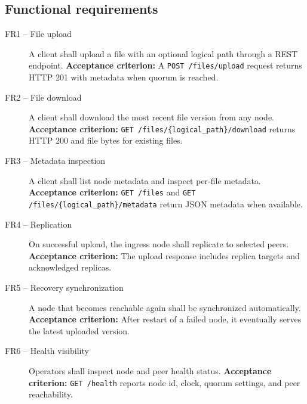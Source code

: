 \documentclass{scrartcl}
\begin{document}
\subsection*{Functional requirements}
\begin{description}
  \item[FR1 -- File upload] A client shall upload a file with an optional logical path through a REST endpoint.
  \textbf{Acceptance criterion:} A \texttt{POST /files/upload} request returns HTTP 201 with metadata when quorum is reached.

  \item[FR2 -- File download] A client shall download the most recent file version from any node.
  \textbf{Acceptance criterion:} \texttt{GET /files/\{logical\_path\}/download} returns HTTP 200 and file bytes for existing files.

  \item[FR3 -- Metadata inspection] A client shall list node metadata and inspect per-file metadata.
  \textbf{Acceptance criterion:} \texttt{GET /files} and \texttt{GET /files/\{logical\_path\}/metadata} return JSON metadata when available.

  \item[FR4 -- Replication] On successful upload, the ingress node shall replicate to selected peers.
  \textbf{Acceptance criterion:} The upload response includes replica targets and acknowledged replicas.

  \item[FR5 -- Recovery synchronization] A node that becomes reachable again shall be synchronized automatically.
  \textbf{Acceptance criterion:} After restart of a failed node, it eventually serves the latest uploaded version.

  \item[FR6 -- Health visibility] Operators shall inspect node and peer health status.
  \textbf{Acceptance criterion:} \texttt{GET /health} reports node id, clock, quorum settings, and peer reachability.
\end{description}
\end{document}
